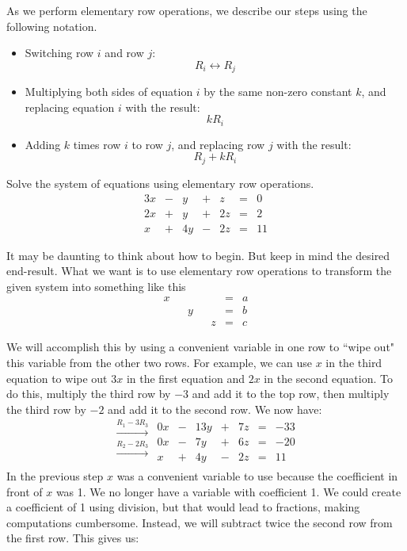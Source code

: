 \documentclass{ximera}
\begin{document}
\begin{notation}
As we perform elementary row operations, we describe our steps using the following notation.
\begin{itemize}
\item 
Switching row $i$ and row $j$: $$R_i\leftrightarrow R_j$$
\item Multiplying both sides of equation $i$ by the same non-zero constant $k$, and replacing equation $i$ with the result:
$$kR_i$$
\item 
Adding $k$ times row $i$ to row $j$, and replacing row $j$ with the result:
$$R_j+kR_i$$
\end{itemize}

\end{notation}

\begin{example}\label{ex:threeeqthreevars1}
Solve the system of equations using elementary row operations.
$$\begin{array}{ccccccc}
      3x & -&y&+&z&= &0 \\
	 2x& +&y&+&2z&=&2\\
     x& +&4y&-&2z&=&11
    \end{array}$$
    
\begin{explanation}
It may be daunting to think about how to begin.  But keep in mind the desired end-result.  What we want is to use elementary row operations to transform the given system into something like this
$$\begin{array}{ccccccc}
      x & &&&&= &a \\
	 & &y&&&=&b\\
     & &&&z&=&c
    \end{array}$$
    
We will accomplish this by using a convenient variable in one row to ``wipe out" this variable from the other two rows.  For example, we can use $x$ in the third equation to wipe out $3x$ in the first equation and $2x$ in the second equation.  To do this, multiply the third row by $-3$ and add it to the top row, then multiply the third row by $-2$ and add it to the second row.  We now have:
$$\begin{array}{c}
 \xrightarrow{R_1-3R_3}\\
 \xrightarrow{R_2-2R_3}\\
\\
 \end{array}
 \begin{array}{ccccccc}
      0x & -&13y&+&7z&= &-33 \\
	 0x& -&7y&+&6z&=&-20\\
     x& +&4y&-&2z&=&11
    \end{array}$$
In the previous step $x$ was a convenient variable to use because the coefficient in front of $x$ was 1.  We no longer have a variable with coefficient 1.  We could create a coefficient of 1 using division, but that would lead to fractions, making computations cumbersome.  Instead, we will subtract twice the second row from the first row. This gives us:


\end{explanation}
\end{example}
\end{document}
